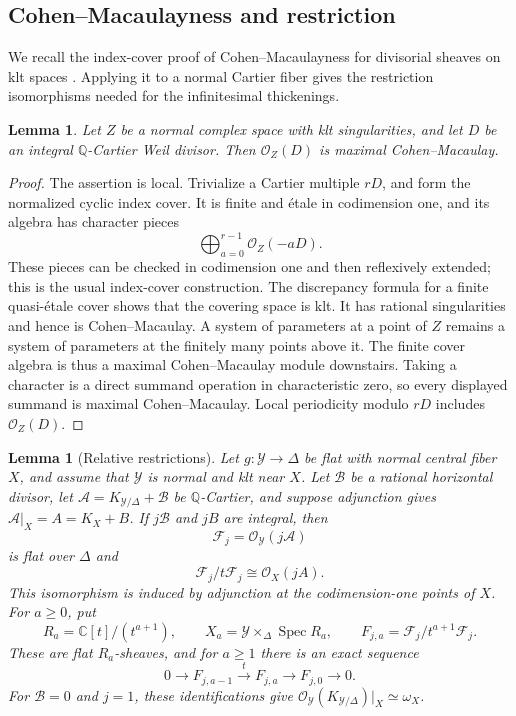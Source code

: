\documentclass[11pt,a4paper]{article}
\numberwithin{equation}{section}
\newtheorem{lemma}[theorem]{Lemma}
\theoremstyle{definition}
\theoremstyle{remark}
\newcommand{\Q}{\mathbb Q}\newcommand{\R}{\mathbb R}
\newcommand{\C}{\mathbb C}\newcommand{\Z}{\mathbb Z}
\newcommand{\OO}{\mathcal O}\newcommand{\cX}{\mathcal X}
\newcommand{\cY}{\mathcal Y}\newcommand{\cB}{\mathcal B}
\newcommand{\cA}{\mathcal A}\newcommand{\cF}{\mathcal F}
\newcommand{\Spec}{\operatorname{Spec}}\newcommand{\vol}{\operatorname{vol}}
\begin{document}
\subsection{Cohen--Macaulayness and restriction}

We recall the index-cover proof of Cohen--Macaulayness for divisorial
sheaves on klt spaces \cite[Corollary~5.25]{KM1998}. Applying it to a
normal Cartier fiber gives the restriction isomorphisms needed for
the infinitesimal thickenings.

\begin{lemma}\label{lem:CM}
Let $Z$ be a normal complex space with klt singularities, and let $D$
be an integral $\Q$-Cartier Weil divisor. Then $\OO_Z(D)$ is maximal
Cohen--Macaulay.
\end{lemma}

\begin{proof}
The assertion is local. Trivialize a Cartier multiple $rD$, and form
the normalized cyclic index cover. It is finite and étale in codimension
one, and its algebra has character pieces
\[
 \bigoplus_{a=0}^{r-1}\OO_Z(-aD).
\]
These pieces can be checked in codimension one and then reflexively
extended; this is the usual index-cover construction. The discrepancy
formula for a finite quasi-étale cover shows that the covering space is
klt. It has rational singularities and hence is Cohen--Macaulay.
A system of parameters at a point of $Z$ remains a system of parameters
at the finitely many points above it. The finite cover algebra is thus
a maximal Cohen--Macaulay module downstairs. Taking a character is a
direct summand operation in characteristic zero, so every displayed
summand is maximal Cohen--Macaulay. Local periodicity modulo $rD$
includes $\OO_Z(D)$.
\end{proof}

\begin{lemma}[Relative restrictions]\label{lem:restrictions}
Let $g:\cY\to\Delta$ be flat with normal central fiber $X$, and assume
that $\cY$ is normal and klt near $X$. Let $\cB$ be a rational horizontal
divisor, let $\cA=K_{\cY/\Delta}+\cB$ be $\Q$-Cartier, and suppose
adjunction gives $\cA|_X=A=K_X+B$. If $j\cB$ and $jB$ are integral,
then
\[
 \cF_j=\OO_{\cY}(j\cA)
\]
is flat over $\Delta$ and
\begin{equation}\label{eq:restriction}
 \cF_j/t\cF_j\cong\OO_X(jA).
\end{equation}
This isomorphism is induced by adjunction at the codimension-one
points of $X$. For $a\ge0$, put
\[
 R_a=\C[t]/(t^{a+1}),\qquad
 X_a=\cY\times_\Delta\Spec R_a,\qquad
 F_{j,a}=\cF_j/t^{a+1}\cF_j.
\]
These are flat $R_a$-sheaves, and for $a\ge1$ there is an exact sequence
\begin{equation}\label{eq:artin-basic}
 0\longrightarrow F_{j,a-1}\xrightarrow{\ t\ }F_{j,a}
 \longrightarrow F_{j,0}\longrightarrow0.
\end{equation}
For $\cB=0$ and $j=1$, these identifications give
$\OO_{\cY}(K_{\cY/\Delta})|_X\simeq\omega_X$.
\end{lemma}
\end{document}
